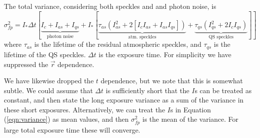 \documentclass[11pt,preprint]{aastex}
\begin{document}
The total variance, considering both speckles and and photon noise, is \citep{2007ApJ...669..642S} 
\begin{equation}
\sigma^2_{fp}  = I_* \Delta t [\underbrace{I_c + I_{as} + I_{qs}}_{\mbox{photon noise}} + I_* [ \underbrace{\tau_{as}\left(I_{as}^2 + 2[I_cI_{as} + I_{as}I_{qs}]  \right)}_{\mbox{atm. speckles}} +  \underbrace{\tau_{qs}\left( I_{qs}^2 + 2 I_c I_{qs}\right)}_{\mbox{QS speckles}}]]
\label{eqn:variance}
\end{equation}
where $\tau_{as}$ is the lifetime of the residual atmospheric speckles, and $\tau_{qs}$ is the lifetime of the QS speckles. $\Delta t$ is the exposure time.  For simplicity we have suppressed the $\vec{r}$ dependence.   

We have likewise dropped the $t$ dependence, but we note that this is somewhat subtle.  We could assume that $\Delta t$ is sufficiently short that the $I$s can be treated as constant, and then state the long exposure variance as a sum of the variance in these short exposures.  Alternatively, we can treat the $I$s in Equation (\ref{eqn:variance}) as mean values, and then $\sigma^2_{fp}$ is the mean of the variance.  For large total exposure time these will converge.
\end{document}
